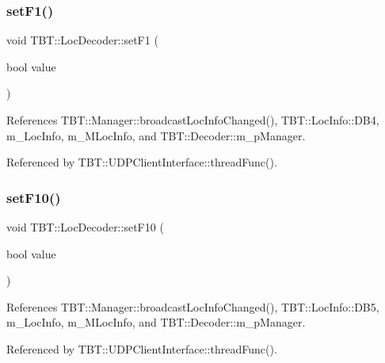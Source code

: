 \subsubsection{\texorpdfstring{set\+F1()}{setF1()}}
{\footnotesize\ttfamily void T\+B\+T\+::\+Loc\+Decoder\+::set\+F1 (\begin{DoxyParamCaption}\item[{bool}]{value }\end{DoxyParamCaption})\hspace{0.3cm}{\ttfamily [inline]}}



References T\+B\+T\+::\+Manager\+::broadcast\+Loc\+Info\+Changed(), T\+B\+T\+::\+Loc\+Info\+::\+D\+B4, m\+\_\+\+Loc\+Info, m\+\_\+\+M\+Loc\+Info, and T\+B\+T\+::\+Decoder\+::m\+\_\+p\+Manager.



Referenced by T\+B\+T\+::\+U\+D\+P\+Client\+Interface\+::thread\+Func().

\mbox{\label{classTBT_1_1LocDecoder_a9976487964f6167d2d5e084d4ed787b7_a9976487964f6167d2d5e084d4ed787b7}} 
\subsubsection{\texorpdfstring{set\+F10()}{setF10()}}
{\footnotesize\ttfamily void T\+B\+T\+::\+Loc\+Decoder\+::set\+F10 (\begin{DoxyParamCaption}\item[{bool}]{value }\end{DoxyParamCaption})\hspace{0.3cm}{\ttfamily [inline]}}



References T\+B\+T\+::\+Manager\+::broadcast\+Loc\+Info\+Changed(), T\+B\+T\+::\+Loc\+Info\+::\+D\+B5, m\+\_\+\+Loc\+Info, m\+\_\+\+M\+Loc\+Info, and T\+B\+T\+::\+Decoder\+::m\+\_\+p\+Manager.



Referenced by T\+B\+T\+::\+U\+D\+P\+Client\+Interface\+::thread\+Func().

\mbox{\label{classTBT_1_1LocDecoder_aa732b54dfa7d535cec4aaab105f4c64d_aa732b54dfa7d535cec4aaab105f4c64d}} 
